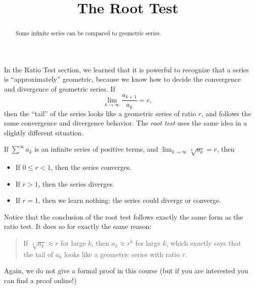 \documentclass{ximera}
\title[Dig-In:]{The Root Test}
\begin{document}
\begin{abstract}
Some infinite series can be compared to geometric series.
\end{abstract}
\maketitle

In the Ratio Test section, we learned that it is powerful to recognize
that a series is ``approximately'' geometric, because we know how to
decide the convergence and divergence of geometric series.  If
\[
\lim_{k \to \infty} \frac{a_{k+1}}{a_k} = r,
\]
then the ``tail'' of the series looks like a geometric series of ratio
$r$, and follows the same convergence and divergence behavior.  The
\textit{root test} uses the same idea in a slightly different
situation.
\begin{theorem}
  If $\sum^\infty a_k$ is an infinite series of positive terms, and $\lim_{k \to \infty} \sqrt[k]{a_k} = r$, then 
  \begin{itemize}
  \item If $0 \leq r < 1$, then the series converges.
  \item If $r>1$, then the series diverges.
  \item If $r = 1$, then we learn nothing:  the series could diverge or converge.
  \end{itemize}
\end{theorem}
Notice that the conclusion of the root test follows exactly the same
form as the ratio test.  It does so for exactly the same reason:
\begin{quote}
  If $\sqrt[k]{a_k} \approx r$ for large $k$, then $a_k \approx r^k$
  for large $k$, which exactly says that the tail of $a_k$ looks like
  a geometric series with ratio $r$.
\end{quote}
Again, we do not give a formal proof in this course (but if you are
interested you can find a proof online!)
\end{document}
